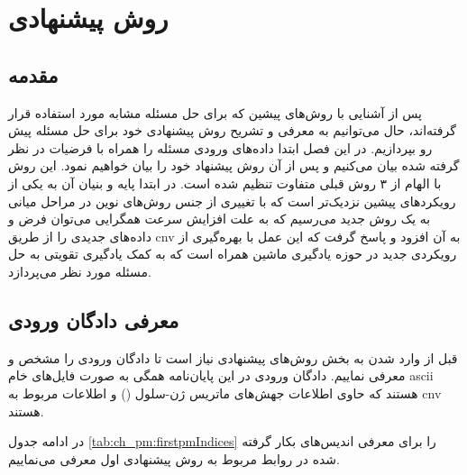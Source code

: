 
\chapter{روش پیشنهادی}
\section{مقدمه} 

پس از آشنایی با روش‌های پیشین که برای حل مسئله مشابه مورد استفاده قرار گرفته‌اند، حال می‌توانیم به معرفی و تشریح روش‌ پیشنهادی خود برای حل مسئله پیش رو بپردازیم. در این فصل ابتدا داده‌های ورودی مسئله را همراه با فرضیات در نظر گرفته شده بیان می‌کنیم و پس از آن روش پیشنهاد خود را بیان خواهیم نمود. این روش با الهام از ۳ روش قبلی متفاوت تنظیم شده است. در ابتدا پایه و بنیان آن به یکی از رویکردهای پیشین نزدیک‌تر است که با تغییری از جنس روش‌‌های نوین در مراحل میانی به یک روش جدید می‌رسیم که به علت افزایش سرعت همگرایی می‌توان فرض و داده‌های جدیدی را از طریق \gls{cnv} به آن افزود و پاسخ گرفت که این عمل با بهره‌گیری از رویکردی جدید در حوزه یادگیری ماشین همراه است که به کمک یادگیری تقویتی به حل مسئله مورد نظر می‌پردازد.

\section{معرفی دادگان ورودی}
قبل از وارد شدن به بخش روش‌های پیشنهادی نیاز است تا دادگان ورودی را مشخص و معرفی نماییم. دادگان ورودی در این پایان‌نامه همگی به صورت فایل‌های خام \gls{ascii} هستند که حاوی اطلاعات جهش‌های ماتریس ژن-سلول () و اطلاعات مربوط به \gls{cnv} هستند.

در ادامه جدول
\ref{tab:ch_pm:firstpmIndices}
را برای معرفی اندیس‌های بکار گرفته شده در روابط مربوط به روش پیشنهادی اول معرفی می‌نماییم.

